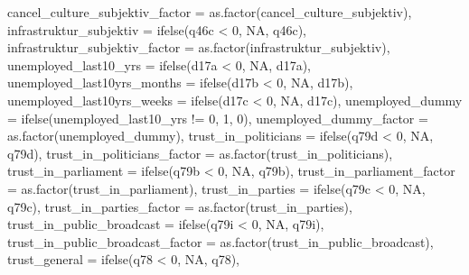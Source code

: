 \documentclass[
]{article}
\newenvironment{Shaded}{\begin{snugshade}}{\end{snugshade}}
\newcommand{\AttributeTok}[1]{\textcolor[rgb]{0.77,0.63,0.00}{#1}}
\newcommand{\ConstantTok}[1]{\textcolor[rgb]{0.00,0.00,0.00}{#1}}
\newcommand{\DecValTok}[1]{\textcolor[rgb]{0.00,0.00,0.81}{#1}}
\newcommand{\FunctionTok}[1]{\textcolor[rgb]{0.00,0.00,0.00}{#1}}
\newcommand{\NormalTok}[1]{#1}
\newcommand{\SpecialCharTok}[1]{\textcolor[rgb]{0.00,0.00,0.00}{#1}}
\begin{document}
\begin{Shaded}
\begin{Highlighting}[]
         \AttributeTok{cancel\_culture\_subjektiv\_factor =} \FunctionTok{as.factor}\NormalTok{(cancel\_culture\_subjektiv),}
         \AttributeTok{infrastruktur\_subjektiv =} \FunctionTok{ifelse}\NormalTok{(q46c }\SpecialCharTok{\textless{}} \DecValTok{0}\NormalTok{, }\ConstantTok{NA}\NormalTok{, q46c),}
         \AttributeTok{infrastruktur\_subjektiv\_factor =} \FunctionTok{as.factor}\NormalTok{(infrastruktur\_subjektiv),}
         \AttributeTok{unemployed\_last10\_yrs =} \FunctionTok{ifelse}\NormalTok{(d17a }\SpecialCharTok{\textless{}} \DecValTok{0}\NormalTok{, }\ConstantTok{NA}\NormalTok{, d17a),}
         \AttributeTok{unemployed\_last10yrs\_months =} \FunctionTok{ifelse}\NormalTok{(d17b }\SpecialCharTok{\textless{}} \DecValTok{0}\NormalTok{, }\ConstantTok{NA}\NormalTok{, d17b),}
         \AttributeTok{unemployed\_last10yrs\_weeks =} \FunctionTok{ifelse}\NormalTok{(d17c }\SpecialCharTok{\textless{}} \DecValTok{0}\NormalTok{, }\ConstantTok{NA}\NormalTok{, d17c),}
         \AttributeTok{unemployed\_dummy =} \FunctionTok{ifelse}\NormalTok{(unemployed\_last10\_yrs }\SpecialCharTok{!=} \DecValTok{0}\NormalTok{, }\DecValTok{1}\NormalTok{, }\DecValTok{0}\NormalTok{),}
         \AttributeTok{unemployed\_dummy\_factor =} \FunctionTok{as.factor}\NormalTok{(unemployed\_dummy),}
         \AttributeTok{trust\_in\_politicians =} \FunctionTok{ifelse}\NormalTok{(q79d }\SpecialCharTok{\textless{}} \DecValTok{0}\NormalTok{, }\ConstantTok{NA}\NormalTok{, q79d),}
         \AttributeTok{trust\_in\_politicians\_factor =} \FunctionTok{as.factor}\NormalTok{(trust\_in\_politicians),}
         \AttributeTok{trust\_in\_parliament =} \FunctionTok{ifelse}\NormalTok{(q79b }\SpecialCharTok{\textless{}} \DecValTok{0}\NormalTok{, }\ConstantTok{NA}\NormalTok{, q79b),}
         \AttributeTok{trust\_in\_parliament\_factor =} \FunctionTok{as.factor}\NormalTok{(trust\_in\_parliament),}
         \AttributeTok{trust\_in\_parties =} \FunctionTok{ifelse}\NormalTok{(q79c }\SpecialCharTok{\textless{}} \DecValTok{0}\NormalTok{, }\ConstantTok{NA}\NormalTok{, q79c),}
         \AttributeTok{trust\_in\_parties\_factor =} \FunctionTok{as.factor}\NormalTok{(trust\_in\_parties),}
         \AttributeTok{trust\_in\_public\_broadcast =} \FunctionTok{ifelse}\NormalTok{(q79i }\SpecialCharTok{\textless{}} \DecValTok{0}\NormalTok{, }\ConstantTok{NA}\NormalTok{, q79i),}
         \AttributeTok{trust\_in\_public\_broadcast\_factor =} \FunctionTok{as.factor}\NormalTok{(trust\_in\_public\_broadcast),}
         \AttributeTok{trust\_general =} \FunctionTok{ifelse}\NormalTok{(q78 }\SpecialCharTok{\textless{}} \DecValTok{0}\NormalTok{, }\ConstantTok{NA}\NormalTok{, q78),}

\end{Highlighting}
\end{Shaded}
\end{document}
